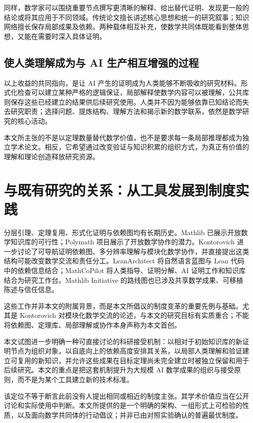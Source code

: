 \documentclass[UTF8,11pt,a4paper,fontset=fandol]{ctexart}
\theoremstyle{definition}\newtheorem{definition}{定义}
\begin{document}
同样，数学家可以围绕重要节点撰写更清晰的解释、给出替代证明、发现更一般的结论或将其应用于不同领域。传统论文擅长讲述核心思想和统一的研究叙事；知识网络擅长保存局部成果及依赖。两种载体相互补充，使数学共同体既能看到整体思想，又能在需要时深入具体证明。

\subsection{使人类理解成为与 AI 生产相互增强的过程}
以上收益的共同指向，是让 AI 产生的证明成为人类能够不断吸收的研究材料。形式化检查可以建立某种严格的逻辑保证，局部解释使数学内容可以被理解，公共库则保存这些已经建立的结果供后续研究使用。人类并不因为能够依靠已知结论而失去研究职责；选择问题、提炼结构、理解方法和揭示新的数学联系，依然是数学研究的核心活动。

本文所主张的不是以定理数量替代数学价值，也不是要求每一条局部推理都成为独立学术论文。相反，它希望通过改变验证与知识积累的组织方式，为真正有价值的理解和理论创造释放研究资源。

\section{与既有研究的关系：从工具发展到制度实践}
分层引理、定理复用、形式化证明与依赖图均有长期历史。Mathlib 已展示开放数学知识库的可行性\cite{mathlib}；Polymath 项目展示了开放数学协作的潜力\cite{polymath}。Kontorovich 进一步讨论了可导航证明依赖图、多分辨率理解与模块化数学协作，并直接提出这类结构可能改变数学交流和责任分工\cite{kontorovich}。LeanArchitect 将自然语言蓝图与 Lean 代码中的依赖信息结合\cite{architect}；MathCoPilot 将人类指导、证明分解、AI 证明工作和知识库结合为研究工作台\cite{copilot}。Mathlib Initiative 的路线图也已涉及共享数学成果、可移植陈述与信任信息\cite{roadmap}。

这些工作并非本文的附属背景，而是本文所倡议的制度变革的重要先例与基础。尤其是 Kontorovich 对模块化数学交流的论述，与本文的研究目标有实质重合；不能将依赖图、定理库、局部理解或协作本身声称为本文首创。

本文试图进一步明确一种可直接讨论的科研接受机制：以相对于初始知识库的新证明节点为组织对象，以自底向上的依赖高度安排其关系，以局部人类理解和验证建立可复用的新知识，并允许这些成果在目标定理尚未完全建立时被独立保留和用于后续研究。本文的重点是把这套机制提升为大规模 AI 数学成果的组织与接受原则，而不是为某个工具建立新的技术标准。

该定位不等于断言此前没有人提出相同或相近的制度主张。其学术价值应当在公开讨论和实际使用中判断。本文所提供的是一个明确的架构、一组形式上可检验的性质，以及面向数学共同体的行动倡议；并非已由对照实验确认的普遍最优制度。
\end{document}
